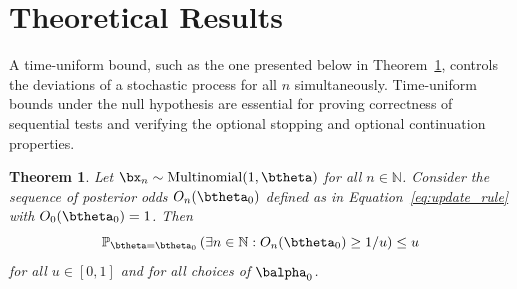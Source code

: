 \documentclass[11pt]{article}
\newtheorem{thm}{Theorem}[section]
\begin{document}
\section{Theoretical Results}
\label{sec:theory}
A time-uniform bound, such as the one presented below in Theorem~\ref{thm:type_1_error}, controls the deviations of a stochastic process for all $n$ simultaneously.
Time-uniform bounds under the null hypothesis are essential for proving correctness of sequential tests and verifying the optional stopping and optional continuation properties.
\begin{thm}  
  \label{thm:type_1_error}
  Let $\bx_n\sim \mathrm{Multinomial}(1,\btheta)$ for all $n \in \mathbb{N}$.
Consider the sequence of posterior odds $O_n(\btheta_0)$ defined as in Equation~\ref{eq:update_rule} with $O_0(\btheta_0)=1$. Then
\begin{equation}
  \label{eq:type_1_error}
  \mathbb{P}_{\btheta = \btheta_0}\left( \exists n \in \mathbb{N}: O_n(\btheta_0) \geq 1/u \right) \leq u
\end{equation}
for all $u \in [0,1]$ and for all choices of $\balpha_0$.
\end{thm}
\end{document}
